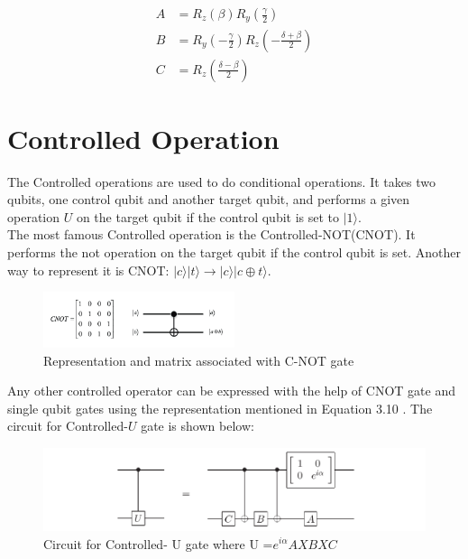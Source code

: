 \begin{equation}
\begin{split}
A & = R_z(\beta)R_y(\frac{\gamma}{2})\\
B & = R_y(-\frac{\gamma}{2})R_z(-\frac{\delta+\beta}{2})\\
C & =R_z(\frac{\delta-\beta}{2})
\end{split}
\end{equation}\section{Controlled Operation}
The Controlled operations are used to do conditional operations. It takes two qubits, one control qubit and another target qubit, and performs a given operation $U$ on the target qubit if the control qubit is set to $|1\rangle$. \\
The most famous Controlled operation is the Controlled-NOT({\scshape CNOT}). It performs the not operation on the target qubit if the control qubit is set. Another way to represent it is  {\scshape CNOT}: $|c\rangle |t\rangle \rightarrow |c\rangle|c \oplus t\rangle$. 
\newpage
\begin{figure}[t]
\centering
\includegraphics[width=0.5\textwidth]{images/cnot.png}\par
\label{cnot}
\caption{Representation and matrix associated with C-NOT gate}
\end{figure}
Any other controlled operator can be expressed with the help of {\scshape CNOT} gate and single qubit gates using the representation mentioned in Equation 3.10 . The circuit for Controlled-$U$ gate is shown below:
\begin{figure}[h]
\centering
\includegraphics[width=1\textwidth]{images/cu.png}\par
\label{cU}
\caption{Circuit for Controlled- U gate where U =$e^{i\alpha}AXBXC$}
\end{figure}
\newline
